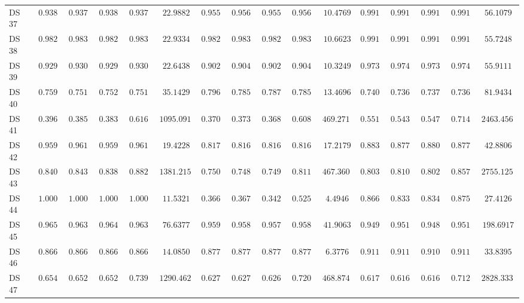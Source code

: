 {\begin{longtable}{|l|ccccc|ccccc|ccccc|}
		DS 37 & $0.9381$ & $0.9378$ & $0.9380$ & $0.9378$ & $22.9882$ & $0.9558$ & $0.9560$ & $0.9557$ & $0.9560$ & $10.4769$ & $\boldsymbol{0.9912}$ & $\boldsymbol{0.9914}$ & $\boldsymbol{0.9911}$ & $\boldsymbol{0.9914}$ & $56.1079$ \\
		DS 38 & $0.9823$ & $0.9836$ & $0.9822$ & $0.9836$ & $22.9334$ & $0.9823$ & $0.9836$ & $0.9822$ & $0.9836$ & $10.6623$ & $0.9912$ & $0.9918$ & $0.9911$ & $0.9918$ & $55.7248$ \\
		DS 39 & $0.9292$ & $0.9306$ & $0.9292$ & $0.9306$ & $22.6438$ & $0.9027$ & $0.9042$ & $0.9025$ & $0.9042$ & $10.3249$ & $\boldsymbol{0.9735}$ & $\boldsymbol{0.9741}$ & $\boldsymbol{0.9735}$ & $\boldsymbol{0.9741}$ & $55.9111$ \\
		DS 40 & $0.7593$ & $0.7510$ & $0.7524$ & $0.7510$ & $35.1429$ & $0.7963$ & $0.7855$ & $0.7875$ & $0.7855$ & $13.4696$ & $0.7407$ & $0.7366$ & $0.7375$ & $0.7366$ & $81.9434$ \\
		DS 41 & $0.3966$ & $0.3859$ & $0.3838$ & $0.6162$ & $1095.0911$ & $0.3707$ & $0.3733$ & $0.3682$ & $0.6083$ & $469.2718$ & $\boldsymbol{0.5517}$ & $\boldsymbol{0.5435}$ & $\boldsymbol{0.5470}$ & $\boldsymbol{0.7147}$ & $2463.4569$ \\
		DS 42 & $0.9599$ & $0.9610$ & $0.9597$ & $0.9610$ & $19.4228$ & $0.8175$ & $0.8165$ & $0.8165$ & $0.8165$ & $17.2179$ & $0.8832$ & $0.8778$ & $0.8809$ & $0.8778$ & $42.8806$ \\
		DS 43 & $\boldsymbol{0.8404}$ & $\boldsymbol{0.8439}$ & $\boldsymbol{0.8387}$ & $\boldsymbol{0.8829}$ & $1381.2156$ & $0.7500$ & $0.7480$ & $0.7492$ & $0.8110$ & $467.3601$ & $0.8032$ & $0.8101$ & $0.8025$ & $0.8576$ & $2755.1253$ \\
		DS 44 & $1.0000$ & $1.0000$ & $1.0000$ & $1.0000$ & $11.5321$ & $0.3667$ & $0.3674$ & $0.3426$ & $0.5256$ & $4.4946$ & $0.8667$ & $0.8333$ & $0.8344$ & $0.8750$ & $27.4126$ \\
		DS 45 & $\boldsymbol{0.9654}$ & $\boldsymbol{0.9637}$ & $\boldsymbol{0.9643}$ & $\boldsymbol{0.9637}$ & $76.6377$ & $0.9591$ & $0.9584$ & $0.9579$ & $0.9584$ & $41.9063$ & $0.9497$ & $0.9515$ & $0.9484$ & $0.9515$ & $198.6917$ \\
		DS 46 & $0.8667$ & $0.8667$ & $0.8666$ & $0.8667$ & $14.0850$ & $0.8778$ & $0.8778$ & $0.8776$ & $0.8778$ & $6.3776$ & $0.9111$ & $0.9111$ & $0.9109$ & $0.9111$ & $33.8395$ \\
		DS 47 & $\boldsymbol{0.6543}$ & $\boldsymbol{0.6522}$ & $\boldsymbol{0.6525}$ & $\boldsymbol{0.7391}$ & $1290.4621$ & $0.6277$ & $0.6274$ & $0.6265$ & $0.7205$ & $468.8747$ & $0.6170$ & $0.6167$ & $0.6161$ & $0.7125$ & $2828.3332$ \\

\end{longtable}}
